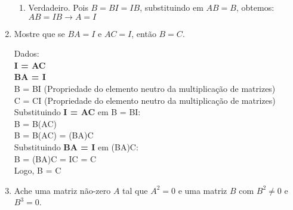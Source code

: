 \documentclass[leqno]{article}
\begin{document}
\begin{enumerate}
\begin{sol}
\begin{enumerate}
				\item Verdadeiro. Pois $B = BI = IB$, substituindo em $AB = B$, obtemos: $AB = IB \rightarrow A = I$
			\end{enumerate} 
		\end{sol} 
		
		\item Mostre que se $BA = I$ e $AC = I$, então $B=C$.
		
		\begin{sol} 
			\newline
			Dados:\\
			\textbf{I = AC}\\
			\textbf{BA = I}\\
			B = BI (Propriedade do elemento neutro da multiplicação de matrizes)\\
			C = CI (Propriedade do elemento neutro da multiplicação de matrizes)\\
			Substituindo \textbf{I = AC} em B = BI:\\
			B = B(AC)\\
			B = B(AC) = (BA)C\\
			Substituindo \textbf{BA = I} em (BA)C:\\
			B = (BA)C = IC = C\\
			Logo, B = C
		\end{sol} 
		\newline
		\item Ache uma matriz não-zero $A$ tal que $A^2 = 0$ e uma matriz $B$ com $B^2 \neq 0$ e $B^3 = 0$.
		

\end{enumerate}
\end{document}
